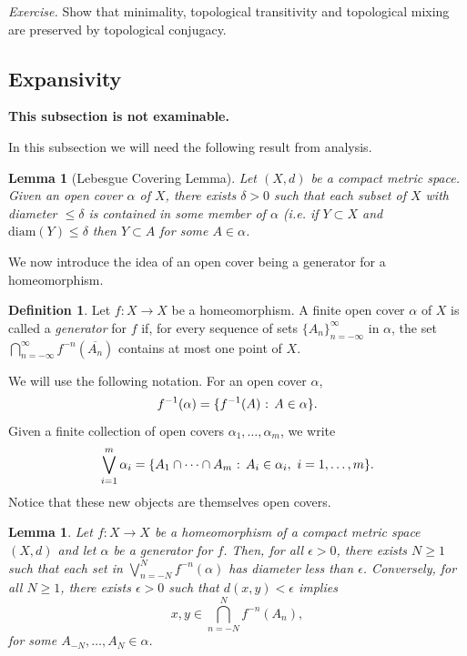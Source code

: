 \documentclass[12pt]{article}
\newtheorem{lemma}[theorem]{Lemma}
\theoremstyle{definition}
\newtheorem{definition}[theorem]{Definition}
\theoremstyle{remark}
\begin{document}
\medskip
\noindent
{\it Exercise.}
Show that minimality, topological transitivity and topological mixing are preserved by topological
conjugacy.

\subsection{Expansivity}

\noindent
{\bf This subsection is not examinable.}

In this subsection we will need the following result from analysis.

\begin{lemma}[Lebesgue Covering Lemma]
Let $(X,d)$ be a compact metric space. Given an open cover $\alpha$ of $X$, there exists 
$\delta>0$ such that each subset of $X$ with diameter $\le \delta$ is contained in some member of $\alpha$ (i.e. if $Y \subset X$ and $\mathrm{diam}(Y) \le \delta$ then $Y \subset A$ for some
$A \in \alpha$.
\end{lemma}

We now introduce the idea of an open cover being a generator for a homeomorphism. 

\begin{definition}
Let $f :X \to X$ be a homeomorphism. A finite open cover $\alpha$ of $X$ is called a {\it generator} for $f$ if, for every sequence of sets $\{A_n\}_{n=-\infty}^\infty$ in $\alpha$, the set
$\bigcap_{n=-\infty}^\infty f^{-n}(\overline{A_n})$ contains at most one point of $X$.
\end{definition}

We will use the following notation. For an open cover $\alpha$,
\[
f^{-1}(\alpha) = \{f^{-1}(A) \hbox{ : } A \in \alpha\}.
\]
Given a finite collection of open covers $\alpha_1,\ldots,\alpha_m$, we write
\[
\bigvee_{i=1}^m \alpha_i = \{A_1 \cap \cdots \cap A_m \hbox{ : } A_i \in \alpha_i, \ i=1,\ldots,m\}.
\]
Notice that these new objects are themselves open covers.

\begin{lemma}\label{lma: generator}
Let $f :X \to X$ be a homeomorphism of a compact metric space
$(X,d)$ and let $\alpha$ be a generator for $f$.
Then, for all $\epsilon>0$, there exists $N 
\ge 1$ such that each set in $\bigvee_{n=-N}^N f^{-n}(\alpha)$ has diameter less than $\epsilon$.
Conversely, for all $N \ge 1$, there exists $\epsilon>0$ such that $d(x,y)< \epsilon$ implies
\[
x,y \in \bigcap_{n=-N}^N f^{-n}(A_n),
\]
for some $A_{-N},\ldots,A_N \in \alpha$.
\end{lemma}
\end{document}
